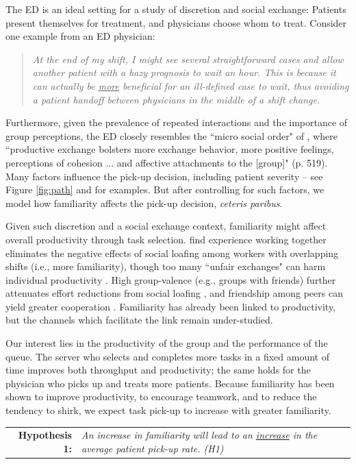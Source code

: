  The ED is an ideal setting for a study of discretion and social exchange: Patients present themselves for treatment, and physicians choose whom to treat. Consider one example from an ED physician: 
 \begin{quote} \textit{At the end of my shift, I might see several straightforward cases and allow another patient with a hazy prognosis to wait an hour. This is because it can actually be \underline{more} beneficial for an ill-defined case to wait, thus avoiding a patient handoff between physicians in the middle of a shift change.} \end{quote} 
 Furthermore, given the prevalence of repeated interactions and the importance of group perceptions, the ED closely resembles the “micro social order" of \cite{Lawler2008}, where “productive exchange bolsters more exchange behavior, more positive feelings, perceptions of cohesion ... and affective attachments to the [group]" (p. 519). Many factors influence the pick-up decision, including patient severity -- see Figure \ref{fig:path} and \cite{Patterson2016} for examples. But after controlling for such factors, we model how familiarity affects the pick-up decision, \textit{ceteris paribus}.
 
 Given such discretion and a social exchange context, familiarity might affect overall productivity through task selection. \cite{Mas2009} find experience working together eliminates the negative effects of social loafing among workers with overlapping shifts (i.e., more familiarity), though too many “unfair exchanges" can harm individual productivity \citep{Kamalahmadi2021}. High group-valence (e.g., groups with friends) further attenuates effort reductions from social loafing \citep{Karau1993}, and friendship among peers can yield greater cooperation \citep{Bandiera2005}. Familiarity has already been linked to productivity, but the channels which facilitate the link remain under-studied.
 
 Our interest lies in the productivity of the group and the performance of the queue. The server who selects and completes more tasks in a fixed amount of time improves both throughput and productivity; the same holds for the physician who picks up and treats more patients. Because familiarity has been shown to improve productivity, to encourage teamwork, and to reduce the tendency to shirk, we expect task pick-up to increase with greater familiarity.
 
 \medskip \noindent
 \begin{tabularx}{\linewidth}{ r X }
    \textbf{Hypothesis 1:} & \textit{An increase in familiarity will lead to an \underline{increase} in the average patient pick-up rate. (H1)} 
 \end{tabularx}   %
 
